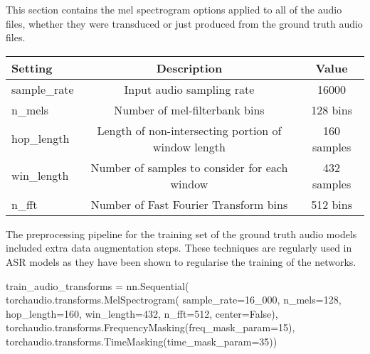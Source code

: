 This section contains the mel spectrogram options applied to all of the audio files,
whether they were transduced or just produced from the ground truth audio files.

{\small\begin{center}
    \begin{tabular} { | l | c | c | }
        \hline
        Setting & Description & Value \\
        \hline
        sample\_rate & Input audio sampling rate & 16000 \\
        n\_mels & Number of mel-filterbank bins & 128 bins \\
        hop\_length & Length of non-intersecting portion of window length & 160 samples \\
        win\_length & Number of samples to consider for each window & 432 samples \\
        n\_fft & Number of Fast Fourier Transform bins & 512 bins \\
        \hline
    \end{tabular}
\end{center}}

The preprocessing pipeline for the training set of the ground truth audio models
included extra data augmentation steps. These techniques are regularly used in ASR
models as they have been shown to regularise the training of the networks.

\begin{python}
train_audio_transforms = nn.Sequential(
    torchaudio.transforms.MelSpectrogram(
        sample_rate=16_000,
        n_mels=128,
        hop_length=160,
        win_length=432,
        n_fft=512,
        center=False),
    torchaudio.transforms.FrequencyMasking(freq_mask_param=15),
    torchaudio.transforms.TimeMasking(time_mask_param=35))
\end{python}